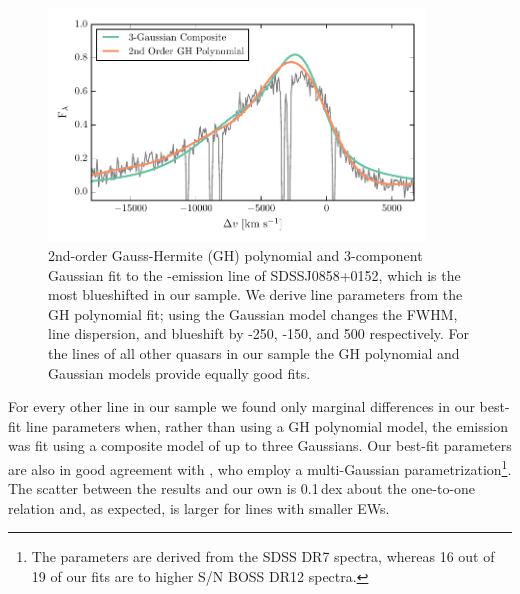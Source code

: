 \begin{figure}
    \includegraphics[width=10cm]{figures/chapter02/fitting_comparison.pdf} 
    \caption{2nd-order Gauss-Hermite (GH) polynomial and 3-component Gaussian fit to the -emission line of SDSSJ0858+0152, which is the most blueshifted in our sample. We derive line parameters from the GH polynomial fit; using the Gaussian model changes the FWHM, line dispersion, and blueshift by -250, -150, and 500 \kms respectively. For the  lines of all other quasars in our sample the GH polynomial and Gaussian models provide equally good fits.} 
    \label{fig:fitting_comparison}
\end{figure}

For every other  line in our sample we found only marginal differences in our best-fit line parameters when, rather than using a GH polynomial model, the  emission was fit using a composite model of up to three Gaussians. 
Our best-fit parameters are also in good agreement with \citet{shen11}, who employ a multi-Gaussian parametrization\footnote{The \citet{shen11} parameters are derived from the SDSS DR7 spectra, whereas 16 out of 19 of our fits are to higher S/N BOSS DR12 spectra.}.  
The scatter between the \citet{shen11} results and our own is 0.1\,dex about the one-to-one relation and, as expected, is larger for lines with smaller EWs. 

